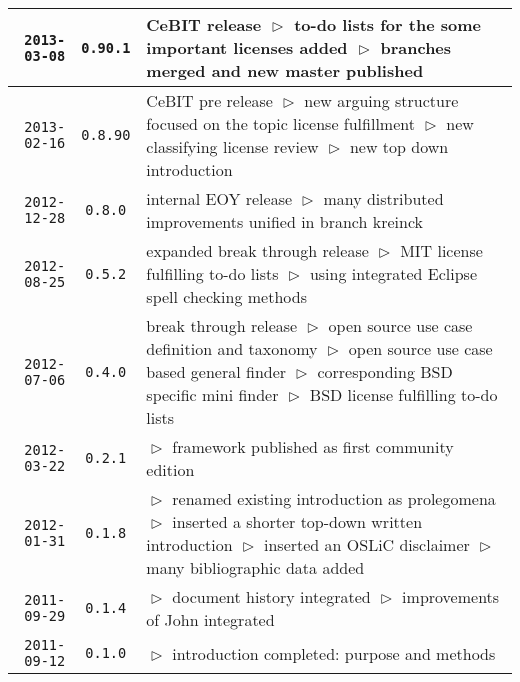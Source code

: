\begin{table}
\begin{center}
\begin{tabular}{|r|c|p{10cm}|}
\hline
    \texttt{2013-03-08}
  & \texttt{0.90.1} 
  & CeBIT release\newline
    $\vartriangleright$ to-do lists for the some important licenses added\newline
    $\vartriangleright$ branches merged and new master published\\
\hline
    \texttt{2013-02-16}
  & \texttt{0.8.90} 
  & CeBIT pre release\newline
    $\vartriangleright$ new arguing structure focused on the topic license fulfillment\newline
    $\vartriangleright$ new classifying license review\newline   
    $\vartriangleright$ new top down introduction\\
\hline
    \texttt{2012-12-28}
  & \texttt{0.8.0} 
  & internal EOY release\newline
    $\vartriangleright$ many distributed improvements unified in branch kreinck\\
\hline
    \texttt{2012-08-25}
  & \texttt{0.5.2} 
  & expanded break through release\newline
    $\vartriangleright$ MIT license fulfilling to-do lists\newline
    $\vartriangleright$ using integrated Eclipse spell checking methods\\
\hline
    \texttt{2012-07-06}
  & \texttt{0.4.0} 
  & break through release\newline
    $\vartriangleright$ open source use case definition and taxonomy\newline 
    $\vartriangleright$ open source use case based general finder\newline 
    $\vartriangleright$ corresponding BSD specific mini finder\newline 
    $\vartriangleright$ BSD license fulfilling to-do lists\\
\hline
    \texttt{2012-03-22}
  & \texttt{0.2.1} 
  & $\vartriangleright$ framework published as first community edition\\
\hline
    \texttt{2012-01-31}
  & \texttt{0.1.8} 
  & $\vartriangleright$ renamed existing introduction as prolegomena\newline
    $\vartriangleright$ inserted a shorter top-down written introduction\newline
    $\vartriangleright$ inserted an OSLiC disclaimer\newline
    $\vartriangleright$ many bibliographic data added\\
\hline
    \texttt{2011-09-29}
  & \texttt{0.1.4} 
  & $\vartriangleright$ document history integrated\newline
    $\vartriangleright$ improvements of John integrated\\
\hline
    \texttt{2011-09-12}
  & \texttt{0.1.0} 
  & $\vartriangleright$ introduction completed: purpose and methods \\
\hline
\hline 
\end{tabular}
\end{center}
\end{table}



%
